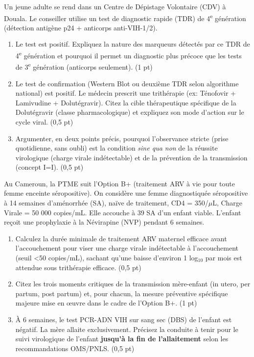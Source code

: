 \documentclass[11pt]{article}
\begin{document}
\begin{exercice}
\label{exo:depistage}
Un jeune adulte se rend dans un Centre de Dépistage Volontaire (CDV) à Douala. Le conseiller utilise un test de diagnostic rapide (TDR) de 4\textsuperscript{e} génération (détection antigène p24 + anticorps anti-VIH-1/2).
\begin{enumerate}
    \item Le test est positif. Expliquez la nature des marqueurs détectés par ce TDR de 4\textsuperscript{e} génération et pourquoi il permet un diagnostic plus précoce que les tests de 3\textsuperscript{e} génération (anticorps seulement). \hfill (1 pt)
    \item Le test de confirmation (Western Blot ou deuxième TDR selon algorithme national) est positif. Le médecin prescrit une trithérapie (ex: Ténofovir + Lamivudine + Dolutégravir). Citez la cible thérapeutique spécifique de la Dolutégravir (classe pharmacologique) et expliquez son mode d'action sur le cycle viral. \hfill (0,5 pt)
    \item Argumenter, en deux points précis, pourquoi l'observance stricte (prise quotidienne, sans oubli) est la condition \textit{sine qua non} de la réussite virologique (charge virale indétectable) et de la prévention de la transmission (concept I=I). \hfill (0,5 pt)
\end{enumerate}
\end{exercice}

\begin{exercice}
\label{exo:ptme}
Au Cameroun, la PTME suit l'Option B+ (traitement ARV à vie pour toute femme enceinte séropositive). On considère une femme diagnostiquée séropositive à 14 semaines d'aménorrhée (SA), naïve de traitement, CD4 = 350/$\mu$L, Charge Virale = 50 000 copies/mL. Elle accouche à 39 SA d'un enfant viable. L'enfant reçoit une prophylaxie à la Névirapine (NVP) pendant 6 semaines.
\begin{enumerate}
    \item Calculez la durée minimale de traitement ARV maternel efficace avant l'accouchement pour viser une charge virale indétectable à l'accouchement (seuil \textless 50 copies/mL), sachant qu'une baisse d'environ 1 log$_{10}$ par mois est attendue sous trithérapie efficace. \hfill (0,5 pt)
    \item Citez les trois moments critiques de la transmission mère-enfant (in utero, per partum, post partum) et, pour chacun, la mesure préventive spécifique majeure mise en œuvre dans le cadre de l'Option B+. \hfill (1 pt)
    \item À 6 semaines, le test PCR-ADN VIH sur sang sec (DBS) de l'enfant est négatif. La mère allaite exclusivement. Précisez la conduite à tenir pour le suivi virologique de l'enfant \textbf{jusqu'à la fin de l'allaitement} selon les recommandations OMS/PNLS. \hfill (0,5 pt)
\end{enumerate}
\end{exercice}
\end{document}
